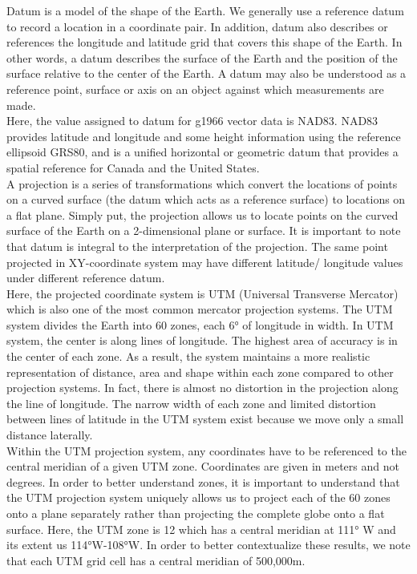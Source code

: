 \documentclass[11pt]{article}
\begin{document}
Datum is a model of the shape of the Earth. We generally use a reference datum to record a location in a coordinate pair. In addition, datum also describes or references the longitude and latitude grid that covers this shape of the Earth. In other words, a datum describes the surface of the Earth and the position of the surface relative to the center of the Earth. A
datum may also be understood as a reference point, surface or axis on an object against which measurements are made.\\

Here, the value assigned to datum for g1966 vector data is NAD83. NAD83 provides latitude
and longitude and some height information using the reference ellipsoid GRS80, and is a unified
horizontal or geometric datum that provides a spatial reference for Canada and the United
States.\\

A projection is a series of transformations which convert the locations of points on a curved
surface (the datum which acts as a reference surface) to locations on a flat plane. Simply put,
the projection allows us to locate points on the curved surface of the Earth on a 2-dimensional
plane or surface. It is important to note that datum is integral to the interpretation of the
projection. The same point projected in XY-coordinate system may have different latitude/
longitude values under different reference datum.\\

Here, the projected coordinate system is UTM (Universal Transverse Mercator) which is also
one of the most common mercator projection systems. The UTM system divides the Earth into
60 zones, each 6° of longitude in width. In UTM system, the center is along lines of longitude.
The highest area of accuracy is in the center of each zone. As a result, the system maintains a
more realistic representation of distance, area and shape within each zone compared to other
projection systems. In fact, there is almost no distortion in the projection along the line of
longitude. The narrow width of each zone and limited distortion between lines of latitude in the
UTM system exist because we move only a small distance laterally.\\

Within the UTM projection system, any coordinates have to be referenced to the central
meridian of a given UTM zone. Coordinates are given in meters and not degrees. In order to
better understand zones, it is important to understand that the UTM projection system uniquely
allows us to project each of the 60 zones onto a plane separately rather than projecting the
complete globe onto a flat surface. Here, the UTM zone is 12 which has a central meridian at 111° W and its extent us 114°W-108°W. In order to better contextualize these results, we note
that each UTM grid cell has a central meridian of 500,000m.\\
\end{document}
